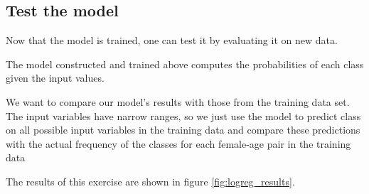 \subsection*{Test the model}

Now that the model is trained, one can test it by evaluating it on new data.

The model constructed and trained above computes the probabilities
of each class given the input values.

We want to compare our model's results with those from the training data set.
The input variables have narrow ranges, so we just use the model to predict
class on all possible input variables in the training data and compare these
predictions with the actual frequency of the classes for each female-age pair 
in the training data

The results of this exercise are shown in figure \ref{fig:logreg_results}.


